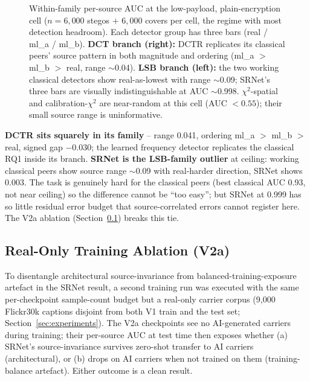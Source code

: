 \documentclass[10pt,twocolumn,a4paper]{article}
\begin{document}
\begin{figure}[!htbp]
\caption{Within-family per-source AUC at the low-payload, plain-encryption cell ($n\!=\!6{,}000$ stegos $+$ $6{,}000$ covers per cell, the regime with most detection headroom). Each detector group has three bars (real / ml\_a / ml\_b). \textbf{DCT branch (right):} DCTR replicates its classical peers' source pattern in both magnitude and ordering (ml\_a $>$ ml\_b $>$ real, range $\sim$0.04). \textbf{LSB branch (left):} the two working classical detectors show real-as-lowest with range $\sim$0.09; SRNet's three bars are visually indistinguishable at AUC $\sim$0.998. $\chi^2$-spatial and calibration-$\chi^2$ are near-random at this cell (AUC $\!<\!0.55$); their small source range is uninformative.}
\label{fig:within-family}
\end{figure}

\textbf{DCTR sits squarely in its family} -- range 0.041, ordering ml\_a $>$ ml\_b $>$ real, signed gap $-0.030$; the learned frequency detector replicates the classical RQ1 inside its branch. \textbf{SRNet is the LSB-family outlier} at ceiling: working classical peers show source range $\sim$0.09 with real-harder direction, SRNet shows 0.003. The task is genuinely hard for the classical peers (best classical AUC 0.93, not near ceiling) so the difference cannot be ``too easy''; but SRNet at 0.999 has so little residual error budget that source-correlated errors cannot register here. The V2a ablation (Section~\ref{sec:v2a}) breaks this tie.

\subsection{Real-Only Training Ablation (V2a)}
\label{sec:v2a}

To disentangle architectural source-invariance from balanced-training-exposure artefact in the SRNet result, a second training run was executed with the same per-checkpoint sample-count budget but a real-only carrier corpus (9{,}000 Flickr30k captions disjoint from both V1 train and the test set; Section~\ref{sec:experiments}). The V2a checkpoints see no AI-generated carriers during training; their per-source AUC at test time then exposes whether (a) SRNet's source-invariance survives zero-shot transfer to AI carriers (architectural), or (b) drops on AI carriers when not trained on them (training-balance artefact). Either outcome is a clean result.
\end{document}
